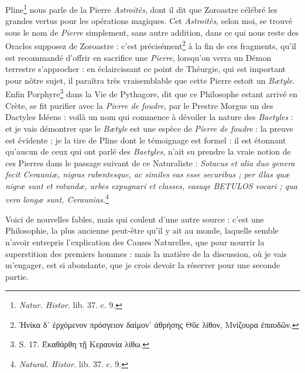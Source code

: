 \documentclass[a4paper, 11pt, oneside, polutonikogreek, french]{article}
\begin{document}
Pline\footnote{\emph{Natur. Histor.} lib. 37. c. 9.} nous parle de la Pierre \emph{Astroitès}, dont il dit que Zoroastre célébré les grandes vertus pour les opérations magiques. Cet \emph{Astroitès}, selon moi, se trouvé sous le nom de \emph{Pierre} simplement, sans autre addition, dans ce qui nous reste des Oracles supposez de Zoroastre : c'est précisément\footnote{Ἡνἰκα δ᾽ ἐρχόμενον πρόσγειον δαἱμον᾽ ἀθρήσης Θῦε λίθον, Μνίζουρα ἐπαυδὢν.} à la fin de ces fragments, qu'il est recommandé d'offrir en sacrifice une \emph{Pierre}, lorsqu'on verra un Démon terrestre s'approcher : en éclaircissant ce point de Théurgie, qui est important pour nôtre sujet, il paraîtra très vraisemblable que cette Pierre estoit un \emph{Bætyle}. Enfin Porphyre\footnote{S. 17. Ὲκαθάρθη τῇ Κεραυνία λίθω.} dans la Vie de Pythagore, dit que ce Philosophe estant arrivé en Crète, se fit purifier avec la \emph{Pierre de foudre}, par le Prestre Morgus un des Dactyles Idéens : voilà un nom qui commence à dévoiler la nature des \emph{Baetyles} : et je vais démontrer que le \emph{Bætyle} est une espèce de \emph{Pierre de foudre} : la preuve est évidente ; je la tire de Pline dont le témoignage est formel : il est étonnant qu'aucun de ceux qui ont parlé des \emph{Baetyles}, n'ait su prendre la vraie notion de ces Pierres dans le passage suivant de ce Naturaliste : \emph{Sotacus et alia duo genera fecit Cerauniæ, nigras rubentesque, ac similes eas esse securibus ; per illas quæ nigræ sunt et rotundæ, urbes expugnari et classes, easuqe BETULOS vocari ; qua vero longæ sunt, Ceraunias.}\footnote{\emph{Natural. Histor.} lib. 37. c. 9.}

Voici de nouvelles fables, mais qui coulent d'une autre source : c'est une Philosophie, la plus ancienne peut-être qu'il y ait au monde, laquelle semble n'avoir entrepris l'explication des Causes Naturelles, que pour nourrir la superstition des premiers hommes : mais la matière de la discussion, où je vais m'engager, est si abondante, que je crois devoir la réserver pour une seconde partie.
\clearpage
\end{document}
